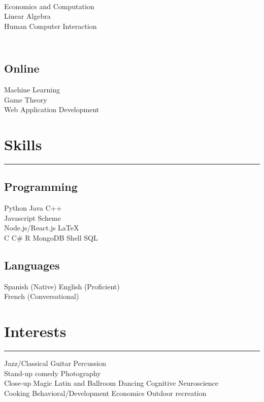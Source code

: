 \documentclass[]{dafirebanks-resume-openfont}
\begin{document}
\begin{minipage}[t]{0.33\textwidth}
\underline{}\\
Economics and Computation \\
Linear Algebra \\ 
Human Computer Interaction \\

\subsection{\\Online}
Machine Learning\\
Game Theory\\
Web Application Development\\ 
\sectionsep


\section{Skills}
\vspace{-3pt}
{\color{blue}\hrule width 45pt} \vspace{5pt}
\subsection{Programming}
 Python \textbullet{} Java \textbullet{} C++ \\ \textbullet{} Javascript \textbullet{} Scheme\\ 
\textbullet{} Node.js/React.js \textbullet{} \LaTeX\ \\ \sectionsep
{}
 C \textbullet{} C\# \textbullet{} R \textbullet{} MongoDB
\textbullet{} Shell \textbullet{} SQL\\
\sectionsep
\subsection{Languages}
Spanish (Native) \textbullet{} English (Proficient) \\
\textbullet{} French (Conversational)
\sectionsep


\section{Interests}
\vspace{-3pt}
{\color{blue}\hrule width 78pt \vspace{5pt}}
Jazz/Classical Guitar \textbullet{} Percussion\\
\textbullet{} Stand-up comedy
\textbullet{} Photography\\ 
\textbullet{} Close-up Magic
\textbullet{} Latin and Ballroom Dancing \textbullet{} Cognitive Neuroscience\\
\textbullet{} Cooking 
\textbullet{} Behavioral/Development Economics  
\textbullet{} Outdoor recreation


\end{minipage}
\end{document}
